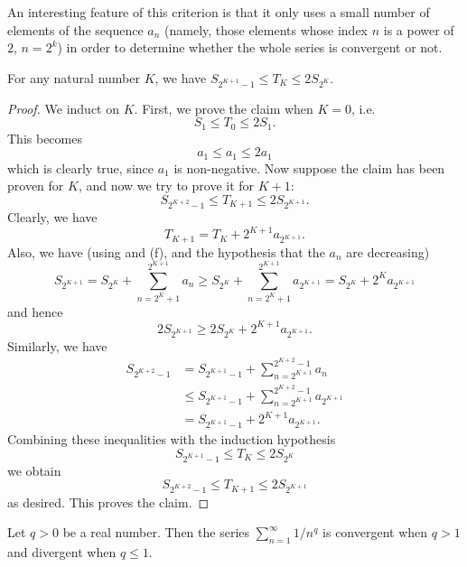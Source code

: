 \begin{rmk}\label{i:7.3.5}
  An interesting feature of this criterion is that it only uses a small number of elements of the sequence \(a_n\)
  (namely, those elements whose index \(n\) is a power of \(2\), \(n = 2^k\))
  in order to determine whether the whole series is convergent or not.
\end{rmk}

\begin{lem}\label{i:7.3.6}
  For any natural number \(K\), we have \(S_{2^{K + 1} - 1} \leq T_K \leq 2S_{2^K}\).
\end{lem}

\begin{proof}
  We induct on \(K\).
  First, we prove the claim when \(K = 0\), i.e.
  \[
    S_1 \leq T_0 \leq 2S_1.
  \]
  This becomes
  \[
    a_1 \leq a_1 \leq 2a_1
  \]
  which is clearly true, since \(a_1\) is non-negative.
  Now suppose the claim has been proven for \(K\), and now we try to prove it for \(K + 1\):
  \[
    S_{2^{K + 2} - 1} \leq T_{K + 1} \leq 2S_{2^{K + 1}}.
  \]
  Clearly, we have
  \[
    T_{K + 1} = T_K + 2^{K + 1} a_{2^{K + 1}}.
  \]
  Also, we have
  (using  and (f), and the hypothesis that the \(a_n\) are decreasing)
  \[
    S_{2^{K + 1}} = S_{2^K} + \sum_{n = 2^K + 1}^{2^{K + 1}} a_n \geq S_{2^K} + \sum_{n = 2^K + 1}^{2^{K + 1}} a_{2^{K + 1}} = S_{2^K} + 2^K a_{2^{K + 1}}
  \]
  and hence
  \[
    2S_{2^{K + 1}} \geq 2S_{2^K} + 2^{K + 1} a_{2^{K + 1}}.
  \]
  Similarly, we have
  \begin{align*}
    S_{2^{K + 2} - 1} & = S_{2^{K + 1} - 1} + \sum_{n = 2^{K + 1}}^{2^{K + 2} - 1} a_n              \\
                      & \leq S_{2^{K + 1} - 1} + \sum_{n = 2^{K + 1}}^{2^{K + 2} - 1} a_{2^{K + 1}} \\
                      & = S_{2^{K + 1} - 1} + 2^{K + 1} a_{2^{K + 1}}.
  \end{align*}
  Combining these inequalities with the induction hypothesis
  \[
    S_{2^{K + 1} - 1} \leq T_K \leq 2S_{2^K}
  \]
  we obtain
  \[
    S_{2^{K + 2} - 1} \leq T_{K + 1} \leq 2S_{2^{K + 1}}
  \]
  as desired.
  This proves the claim.
\end{proof}

\begin{cor}\label{i:7.3.7}
  Let \(q > 0\) be a real number.
  Then the series \(\sum_{n = 1}^\infty 1 / n^q\) is convergent when \(q > 1\) and divergent when \(q \leq 1\).
\end{cor}

